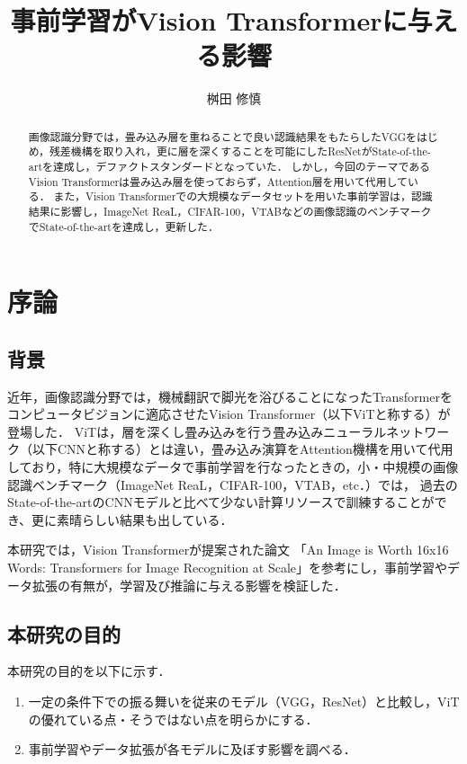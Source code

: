 \documentclass[a4paper, oneside, openany, dvipdfmx]{suribt}%
\title{事前学習がVision Transformerに与える影響}
\author{桝田 修慎}
\begin{document}
\maketitle%

\frontmatter%
\begin{abstract}%
画像認識分野では，畳み込み層を重ねることで良い認識結果をもたらしたVGGをはじめ，残差機構を取り入れ，更に層を深くすることを可能にしたResNetがState-of-the-artを達成し，デファクトスタンダードとなっていた．
しかし，今回のテーマであるVision Transformerは畳み込み層を使っておらず，Attention層を用いて代用している．
また，Vision Transformerでの大規模なデータセットを用いた事前学習は，認識結果に影響し，ImageNet ReaL，CIFAR-100，VTABなどの画像認識のベンチマークでState-of-the-artを達成し，更新した．


\end{abstract}

\setcounter{tocdepth}{2}
\tableofcontents%

\mainmatter%
\chapter{序論}
\section{背景}
近年，画像認識分野では，機械翻訳で脚光を浴びることになったTransformer\cite{vaswani2017attention}をコンピュータビジョンに適応させたVision Transformer（以下ViTと称する）が登場した\cite{dosovitskiy2021image}．
ViTは，層を深くし畳み込みを行う畳み込みニューラルネットワーク（以下CNNと称する）とは違い，畳み込み演算をAttention機構を用いて代用しており，特に大規模なデータで事前学習を行なったときの，小・中規模の画像認識ベンチマーク（ImageNet ReaL，CIFAR-100，VTAB，etc．）では，
過去のState-of-the-artのCNNモデルと比べて少ない計算リソースで訓練することができ、更に素晴らしい結果も出している．

本研究では，Vision Transformerが提案された論文
「An Image is Worth 16x16 Words: Transformers for Image Recognition at Scale」を参考にし，事前学習やデータ拡張の有無が，学習及び推論に与える影響を検証した．
\section{本研究の目的}
本研究の目的を以下に示す．
\begin{enumerate}
  \item 一定の条件下での振る舞いを従来のモデル（VGG，ResNet）と比較し，ViTの優れている点・そうではない点を明らかにする．
  \item 事前学習やデータ拡張が各モデルに及ぼす影響を調べる．
\end{enumerate}
\end{document}
